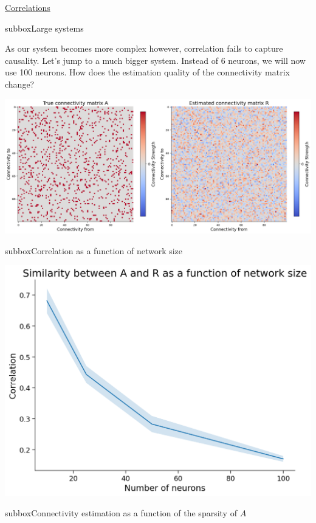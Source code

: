 \begin{textbox}{\href{https://compneuro.neuromatch.io/tutorials/W3D5_NetworkCausality/student/W3D5_Tutorial2.html}{Correlations }   }

\begin{subbox}{subbox}{Large systems}
\scriptsize

As our system becomes more complex however, correlation fails to capture causality.
Let's jump to a much bigger system. Instead of 6 neurons, we will now use 100 neurons. How does the estimation quality of the connectivity matrix change? 
\begin{center}

\includegraphics[scale=0.18]{Figures/NC/NC_Figure11.png}
\end{center}
\end{subbox}

\begin{subbox}{subbox}{Correlation as a function of network size}
\scriptsize
\begin{center}

\includegraphics[scale=0.15]{Figures/NC/NC_Figure13.png}
\end{center}
\end{subbox}
\begin{subbox}{subbox}{Connectivity estimation as a function of the sparsity of $A$}
\scriptsize


\end{subbox}
\end{textbox}
